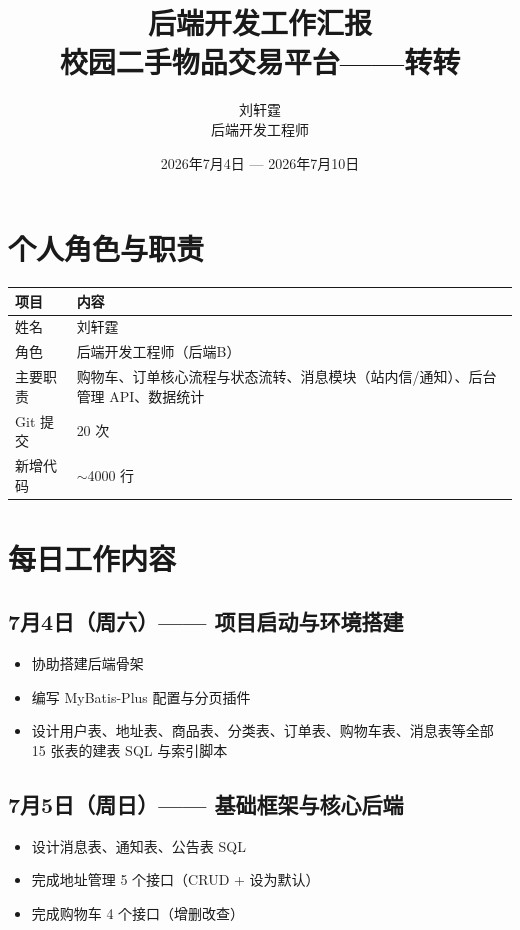 \documentclass[12pt,a4paper]{ctexart}
\title{{\Huge 后端开发工作汇报}\\[0.3cm]{\Large 校园二手物品交易平台——转转}}
\author{{\large 刘轩霆}\\{\small 后端开发工程师}}
\date{2026年7月4日 — 2026年7月10日}
\begin{document}
\maketitle
\thispagestyle{fancy}

\section{个人角色与职责}

\begin{table}[H]
\centering
\begin{tabular}{lp{10cm}}
\toprule
\textbf{项目} & \textbf{内容} \\
\midrule
姓名 & 刘轩霆 \\
角色 & 后端开发工程师（后端B） \\
主要职责 & 购物车、订单核心流程与状态流转、消息模块（站内信/通知）、后台管理 API、数据统计 \\
Git 提交 & 20 次 \\
新增代码 & $\sim$4000 行 \\
\bottomrule
\end{tabular}
\end{table}

\section{每日工作内容}

\subsection{7月4日（周六）—— 项目启动与环境搭建}
\begin{itemize}
    \item 协助搭建后端骨架
    \item 编写 MyBatis-Plus 配置与分页插件
    \item 设计用户表、地址表、商品表、分类表、订单表、购物车表、消息表等全部 15 张表的建表 SQL 与索引脚本
\end{itemize}

\subsection{7月5日（周日）—— 基础框架与核心后端}
\begin{itemize}
    \item 设计消息表、通知表、公告表 SQL
    \item 完成地址管理 5 个接口（CRUD + 设为默认）
    \item 完成购物车 4 个接口（增删改查）
\end{itemize}
\end{document}
